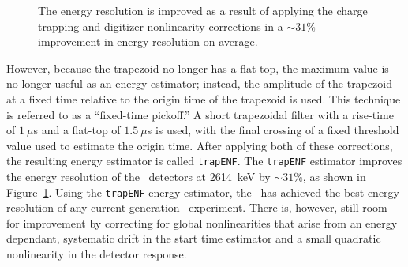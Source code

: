 \documentclass[/main.tex]{subfiles}
\begin{document}
\begin{figure}
  \centering
  \caption[Improvement in energy resolution from charge trapping correction]{\label{fig:trapenf}
    The energy resolution is improved as a result of applying the charge trapping and digitizer nonlinearity corrections in a $\sim31\%$ improvement in energy resolution on average.
  }
\end{figure}
However, because the trapezoid no longer has a flat top, the maximum value is no longer useful as an energy estimator; instead, the amplitude of the trapezoid at a fixed time relative to the origin time of the trapezoid is used.
This technique is referred to as a ``fixed-time pickoff.''
A short trapezoidal filter with a rise-time of $1~\mu$s and a flat-top of $1.5~\mu$s is used, with the final crossing of a fixed threshold value used to estimate the origin time.
After applying both of these corrections, the resulting energy estimator is called \texttt{trapENF}.
The \texttt{trapENF} estimator improves the energy resolution of the \MJD\ detectors at 2614~keV by $\sim31\%$, as shown in Figure~\ref{fig:trapenf}.
Using the \texttt{trapENF} energy estimator, the \MJD\ has achieved the best energy resolution of any current generation \znbb\ experiment.
There is, however, still room for improvement by correcting for global nonlinearities that arise from an energy dependant, systematic drift in the start time estimator and a small quadratic nonlinearity in the detector response.
\end{document}
